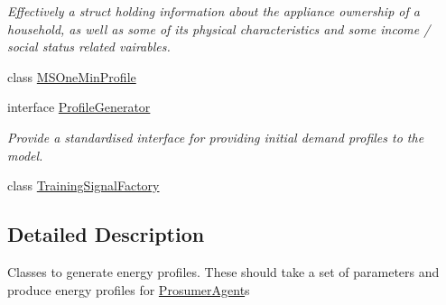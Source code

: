 \begin{DoxyCompactItemize}
\begin{DoxyCompactList}\small\item\em Effectively a struct holding information about the appliance ownership of a household, as well as some of its physical characteristics and some income / social status related vairables. \end{DoxyCompactList}\item 
class \hyperlink{classuk_1_1ac_1_1dmu_1_1iesd_1_1cascade_1_1util_1_1profilegenerators_1_1_m_s_one_min_profile}{M\-S\-One\-Min\-Profile}
\item 
interface \hyperlink{interfaceuk_1_1ac_1_1dmu_1_1iesd_1_1cascade_1_1util_1_1profilegenerators_1_1_profile_generator}{Profile\-Generator}
\begin{DoxyCompactList}\small\item\em Provide a standardised interface for providing initial demand profiles to the model. \end{DoxyCompactList}\item 
class \hyperlink{classuk_1_1ac_1_1dmu_1_1iesd_1_1cascade_1_1util_1_1profilegenerators_1_1_training_signal_factory}{Training\-Signal\-Factory}
\end{DoxyCompactItemize}


\subsection{Detailed Description}
Classes to generate energy profiles. These should take a set of parameters and produce energy profiles for \hyperlink{}{Prosumer\-Agent}s 